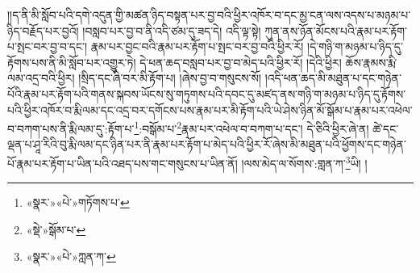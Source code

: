 །།ད་ནི་མི་སློབ་པའི་དགེ་འདུན་གྱི་མཚན་ཉིད་བསྟན་པར་བྱ་བའི་ཕྱིར་འཁོར་བ་དང་མྱ་ངན་ལས་འདས་པ་མཉམ་པ་ཉིད་བརྗོད་པར་བྱའོ། །བསླབ་པར་བྱ་བ་ནི་འདི་ཙམ་དུ་ཟད་དེ། འདི་ལྟ་སྟེ། ཀུན་ནས་ཉོན་མོངས་པའི་རྣམ་པར་རྟོག་པ་སྤང་བར་བྱ་བ་དང་། རྣམ་པར་བྱང་བའི་རྣམ་པར་རྟོག་པ་སྤང་བར་བྱ་བའི་ཕྱིར་རོ། །དེ་གཉི་ག་མཉམ་པ་ཉིད་དུ་རྟོགས་པས་ནི་མི་སློབ་པར་འགྱུར་ཏེ། དེ་ཕན་ཆད་བསླབ་པར་བྱ་བ་མེད་པའི་ཕྱིར་རོ། །དེའི་ཕྱིར། ཆོས་རྣམས་རྨི་ལམ་འདྲ་བའི་ཕྱིར། །སྲིད་དང་ཞི་བར་མི་རྟོག་པ། །ཞེས་བྱ་བ་གསུངས་སོ། །འདི་ཕན་ཆད་མི་མཐུན་པ་དང་གཉེན་པོའི་རྣམ་པར་རྟོག་པའི་གནས་སྐབས་ཡོངས་སུ་གཏུགས་པའི་དབང་དུ་མཛད་ནས་གཉི་ག་མཉམ་པ་ཉིད་དུ་རྟོགས་པའི་ཕྱིར་འཁོར་བ་རྨི་ལམ་དང་འདྲ་བར་དགོངས་པས་རྣམ་པར་མི་རྟོག་པའི་ཡེ་ཤེས་ཉིན་མོ་སྒོམ་པ་རྣམ་པར་འཕེལ་བ་བཀག་པས་ནི་རྨི་ལམ་དུ་:རྟོག་པ་\footnote{«སྣར་»«པེ་»གཏོགས་པ་}:བསྒོམ་པ་\footnote{«སྡེ་»སྒོམ་པ་}རྣམ་པར་འཕེལ་བ་བཀག་པ་དང་། དེ་ཅིའི་ཕྱིར་ཞེ་ན། ཚེ་དང་ལྡན་པ་ཤཱ་རིའི་བུ་རྨི་ལམ་དང་ཉིན་པར་ནི་རྣམ་པར་རྟོག་པ་མེད་པའི་ཕྱིར་རོ་ཞེས་མི་མཐུན་པའི་ཕྱོགས་དང་གཉེན་པོ་རྣམ་པར་རྟོག་པ་ཡིན་པའི་འཐད་པས་གང་གསུངས་པ་ཡིན་ནོ། །ལས་མེད་ལ་སོགས་:གླན་ཀ་\footnote{«སྣར་»«པེ་»ཀླན་ཀ་}ཡི། །
